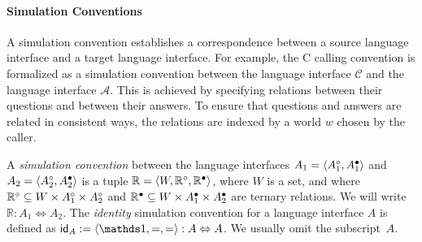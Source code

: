 %
%

\vspace*{-2ex}
\paragraph{Simulation Conventions} \label{sec:simconv} %

A simulation convention establishes a correspondence between
a source language interface and
a target language interface.
For example,
the C calling convention is formalized as a 
simulation convention between
the language interface $\mathcal{C}$ and
the language interface $\mathcal{A}$.
This is achieved
by specifying relations between their questions and between their answers.
To ensure that questions and answers are related in consistent ways,
the relations are indexed by a world $w$ chosen by the caller.

\begin{definition} \label{def:simconv} %
A \emph{simulation convention} between the language interfaces
$A_1 = \langle A_1^\circ, A_1^\bullet \rangle$ and
$A_2 = \langle A_2^\circ, A_2^\bullet \rangle$
is a tuple $\mathbb{R} = \langle W, \mathbb{R}^\circ, \mathbb{R}^\bullet \rangle$,
where $W$ is a set,
and where
$\mathbb{R}^\circ \subseteq W \times A_1^\circ \times A_2^\circ$
and $\mathbb{R}^\bullet \subseteq W \times A_1^\bullet \times A_2^\bullet$
are ternary relations.
We will write $\mathbb{R} : A_1 \Leftrightarrow A_2$.
The \emph{identity} simulation convention
for a language interface $A$
is defined as
$\kw{id}_A := \langle \unitset, {=}, {=} \rangle
  : A \Leftrightarrow A$.
We usually omit the subscript~$A$.
\end{definition}

